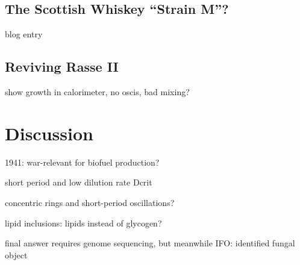 \documentclass[11pt,a4paper,english]{article}
\begin{document}
\subsection{The Scottish Whiskey ``Strain M''?}

blog entry

\subsection{Reviving Rasse II}

show growth in calorimeter, no oscis, bad mixing?

\section{Discussion}

1941: war-relevant for biofuel production?

short period and low dilution rate Dcrit

concentric rings and short-period oscillations?

lipid inclusions: lipids instead of glycogen?

final answer requires genome sequencing, but meanwhile
IFO: identified fungal object




%
\end{document}
